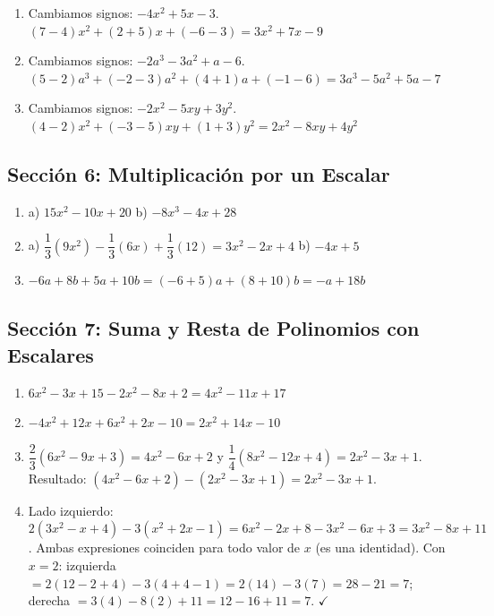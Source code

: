 \documentclass[12pt, letterpaper]{article}
\begin{document}
  \begin{enumerate}[leftmargin=*, label=\textbf{\arabic*.}]
    \item Cambiamos signos: $-4x^2 + 5x - 3$. \quad $(7 - 4)x^2 + (2 + 5)x + (-6 - 3) = 3x^2 + 7x - 9$

    \item Cambiamos signos: $-2a^3 - 3a^2 + a - 6$. \quad $(5-2)a^3 + (-2-3)a^2 + (4+1)a + (-1-6) = 3a^3 - 5a^2 + 5a - 7$

    \item Cambiamos signos: $-2x^2 - 5xy + 3y^2$. \quad $(4-2)x^2 + (-3-5)xy + (1+3)y^2 = 2x^2 - 8xy + 4y^2$
  \end{enumerate}

  \newpage

  \subsection*{Sección 6: Multiplicación por un Escalar}

  \begin{enumerate}[leftmargin=*, label=\textbf{\arabic*.}]
    \item a) $15x^2 - 10x + 20$ \quad b) $-8x^3 - 4x + 28$

    \item a) $\dfrac{1}{3}(9x^2) - \dfrac{1}{3}(6x) + \dfrac{1}{3}(12) = 3x^2 - 2x + 4$ \quad
          b) $-4x + 5$

    \item $-6a + 8b + 5a + 10b = (-6 + 5)a + (8 + 10)b = -a + 18b$
  \end{enumerate}

  \newpage

  \subsection*{Sección 7: Suma y Resta de Polinomios con Escalares}

  \begin{enumerate}[leftmargin=*, label=\textbf{\arabic*.}]
    \item $6x^2 - 3x + 15 - 2x^2 - 8x + 2 = 4x^2 - 11x + 17$

    \item $-4x^2 + 12x + 6x^2 + 2x - 10 = 2x^2 + 14x - 10$

    \item $\dfrac{2}{3}(6x^2 - 9x + 3) = 4x^2 - 6x + 2$ \quad y \quad $\dfrac{1}{4}(8x^2 - 12x + 4) = 2x^2 - 3x + 1$.
          Resultado: $(4x^2 - 6x + 2) - (2x^2 - 3x + 1) = 2x^2 - 3x + 1$.

    \item Lado izquierdo: $2(3x^2 - x + 4) - 3(x^2 + 2x - 1) = 6x^2 - 2x + 8 - 3x^2 - 6x + 3 = 3x^2 - 8x + 11$.
          Ambas expresiones coinciden para todo valor de $x$ (es una identidad).
          Con $x = 2$: izquierda $= 2(12 - 2 + 4) - 3(4 + 4 - 1) = 2(14) - 3(7) = 28 - 21 = 7$; derecha $= 3(4) - 8(2) + 11 = 12 - 16 + 11 = 7$. $\checkmark$
  \end{enumerate}

\fi
\end{document}
